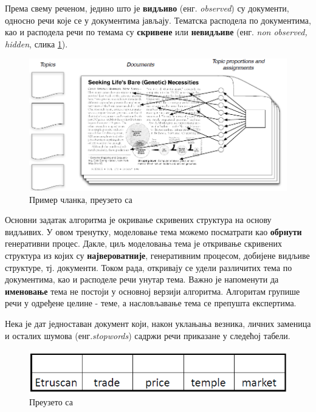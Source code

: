 Према свему реченом, једино што је \textbf{видљиво} (енг. \textit{observed}) су документи, односно речи које се у документима јављају.  Тематска расподела по документима, као и расподела речи по темама су \textbf{скривене} или \textbf{невидљиве} (енг. \textit{non observed, hidden}, слика \ref{fig:slika2}).

\begin{figure}[H]
    \centering
   \includegraphics[scale=0.5]{./Slike/slika2.png} 
	\caption{Пример чланка, преузето са \cite{blei2}}
	\label{fig:slika2}
\end{figure}

Основни задатак алгоритма је окривање скривених структура на основу видљивих. У овом тренутку, моделовање тема можемо посматрати као \textbf{обрнути} генеративни процес. Дакле, циљ моделовања тема је откривање скривених структура из којих су \textbf{највероватније}, генеративним процесом, добијене видљиве структуре, тј. документи. Током рада, откривају се удели различитих тема по документима, као и расподеле речи унутар тема. Важно је напоменути да \textbf{именовање} тема не постоји у основној верзији алгоритма. Алгоритам групише речи у одређене целине - теме, а насловљавање тема се препушта експертима.


Нека је дат једноставан документ који, након уклањања везника, личних заменица и осталих шумова (енг.\textit{stopwords}) садржи речи приказане у следећој табели.

\begin{figure}[H]
    \centering
   \includegraphics[scale=0.8]{./Slike/slika3.png} 
	\caption{Преузето са \cite{mimno1}}
	\label{fig:slika3}
\end{figure}


